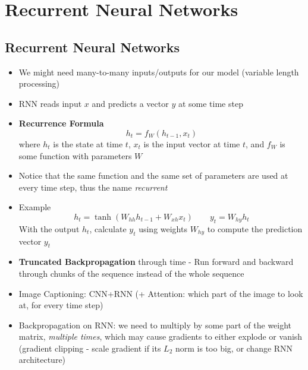\section{Recurrent Neural Networks}
\subsection{Recurrent Neural Networks}
\begin{itemize}
	\item We might need many-to-many inputs/outputs for our model (variable length processing)
	\item RNN reads input $x$ and predicts a vector $y$ at some time step
	\item \textbf{Recurrence Formula}
	$$h_t = f_W(h_{t-1}, x_t)$$
	where $h_t$ is the state at time $t$, $x_t$ is the input vector at time $t$, and $f_W$ is some function with parameters $W$
	\item Notice that the same function and the same set of parameters are used at every time step, thus the name \textit{recurrent}
	\item Example
	$$h_t = \tanh(W_{hh}h_{t-1} + W_{xh}x_t) \qquad y_t = W_{hy}h_t$$
	With the output $h_t$, calculate $y_t$ using weights $W_{hy}$ to compute the prediction vector $y_t$
	\item \textbf{Truncated Backpropagation} through time - Run forward and backward through chunks of the sequence instead of the whole sequence
	\item Image Captioning: CNN+RNN (+ Attention: which part of the image to look at, for every time step)
	\item Backpropagation on RNN: we need to multiply by some part of the weight matrix, \textit{multiple times}, which may cause gradients to either explode or vanish (gradient clipping - scale gradient if its $L_2$ norm is too big, or change RNN architecture)
\end{itemize}

